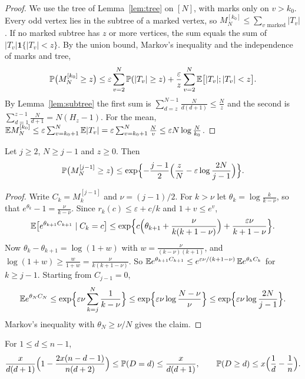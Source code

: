 \begin{proof}
We use the tree of Lemma~\ref{lem:tree} on $[N]$, with marks only on
$v>k_0$. Every odd vertex lies in the subtree of a marked vertex, so
$M^{[k_0]}_N\le\sum_{v\text{ marked}}\lvert T_v\rvert$. If no marked subtree
has $z$ or more vertices, the sum equals the sum of
$\lvert T_v\rvert\mathbf 1\{\lvert T_v\rvert<z\}$. By the union bound, Markov's
inequality and the independence of marks and tree,
\[
 \mathbb{P}\bigl(M^{[k_0]}_N\ge z\bigr)\le\varepsilon\sum_{v=2}^N\mathbb{P}(\lvert T_v\rvert\ge z)
 +\frac\varepsilon z\sum_{v=2}^N\mathbb{E}\bigl[\lvert T_v\rvert;\lvert T_v\rvert<z\bigr].
\]
By Lemma~\ref{lem:subtree} the first sum is
$\sum_{d=z}^{N-1}\frac N{d(d+1)}\le\frac Nz$ and the second is
$\sum_{d=1}^{z-1}\frac N{d+1}=N(H_z-1)$. For the mean,
$\mathbb{E} M^{[k_0]}_N\le\varepsilon\sum_{v=k_0+1}^N\mathbb{E}\lvert T_v\rvert
=\varepsilon\sum_{v=k_0+1}^N\frac Nv\le\varepsilon N\log\frac N{k_0}$.
\end{proof}

\begin{lemma}\label{lem:B-late}
Let $j\ge2$, $N\ge j-1$ and $z\ge0$. Then
\[
 \mathbb{P}\bigl(M^{[j-1]}_N\ge z\bigr)\le\exp\Bigl\{-\frac{j-1}{2}\Bigl(\frac zN-\varepsilon\log\frac{2N}{j-1}\Bigr)\Bigr\}.
\]
\end{lemma}

\begin{proof}
Write $C_k=M^{[j-1]}_k$ and $\nu=(j-1)/2$. For $k>\nu$ let
$\theta_k=\log\frac k{k-\nu}$, so that $e^{\theta_k}-1=\frac\nu{k-\nu}$.
Since $r_k(c)\le\varepsilon+c/k$ and $1+v\le e^v$,
\[
 \mathbb{E}\bigl[e^{\theta_{k+1}C_{k+1}}\mid C_k=c\bigr]
 \le\exp\Bigl\{c\Bigl(\theta_{k+1}+\frac{\nu}{k(k+1-\nu)}\Bigr)+\frac{\varepsilon\nu}{k+1-\nu}\Bigr\}.
\]
Now $\theta_k-\theta_{k+1}=\log(1+w)$ with $w=\frac\nu{(k-\nu)(k+1)}$, and
$\log(1+w)\ge\frac w{1+w}=\frac\nu{k(k+1-\nu)}$. So
$\mathbb{E} e^{\theta_{k+1}C_{k+1}}\le e^{\varepsilon\nu/(k+1-\nu)}\,\mathbb{E} e^{\theta_kC_k}$
for $k\ge j-1$. Starting from $C_{j-1}=0$,
\[
 \mathbb{E} e^{\theta_NC_N}\le\exp\Bigl\{\varepsilon\nu\sum_{k=j}^N\frac1{k-\nu}\Bigr\}
 \le\exp\Bigl\{\varepsilon\nu\log\frac{N-\nu}{\nu}\Bigr\}
 \le\exp\Bigl\{\varepsilon\nu\log\frac{2N}{j-1}\Bigr\}.
\]
Markov's inequality with $\theta_N\ge\nu/N$ gives the claim.
\end{proof}

\begin{lemma}\label{lem:B-D}
For $1\le d\le n-1$,
\[
 \frac{x}{d(d+1)}\Bigl(1-\frac{2x(n-d-1)}{n(d+2)}\Bigr)\le\mathbb{P}(D=d)\le\frac{x}{d(d+1)},
 \qquad\mathbb{P}(D\ge d)\le x\Bigl(\frac1d-\frac1n\Bigr).
\]
\end{lemma}

